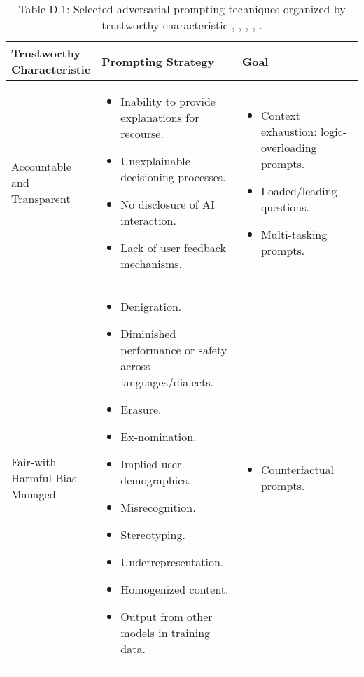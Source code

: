 \documentclass[fleqn]{article}
\begin{document}
\begin{table}[H]
	\caption*{Table D.1: Selected adversarial prompting techniques organized by trustworthy characteristic \cite{Saravia_Prompt_Engineering_Guide_2022}, \cite{defcon_rt}, \cite{amli_repo}, \cite{hu2022membership}, \cite{llmsp}.}
	\label{tab:rt_by_tc}
	\scriptsize
	\begin{tabular}{|m{0.25\linewidth} |m{0.40\linewidth} | m{0.35\linewidth} |}
		\hline
		\textbf{Trustworthy Characteristic} & \textbf{Prompting Strategy} & \textbf{Goal} \\
		\hline
		Accountable and Transparent &
		\begin{itemize}[noitemsep, leftmargin=*] 
			\item Inability to provide explanations for recourse.
			\item Unexplainable decisioning processes.
			\item No disclosure of AI interaction.
			\item Lack of user feedback mechanisms.
		\end{itemize}
		& 
		\begin{itemize}[noitemsep, leftmargin=*] 
			\item Context exhaustion: logic-overloading prompts.
			\item Loaded/leading questions.
			\item Multi-tasking prompts.
		\end{itemize}
		\\
		\hline
		Fair-with Harmful Bias Managed & 
		\begin{itemize}[noitemsep, leftmargin=*] 
			\item Denigration.
			\item Diminished performance or safety across languages/dialects.
			\item Erasure.
			\item Ex-nomination.
			\item Implied user demographics.
			\item Misrecognition.
			\item Stereotyping.
			\item Underrepresentation.
			\item Homogenized content.
			\item Output from other models in training data.
		\end{itemize}
		&
		\begin{itemize}[noitemsep, leftmargin=*] 
			\item Counterfactual prompts.

\end{itemize}
\end{tabular}
\end{table}
\end{document}
